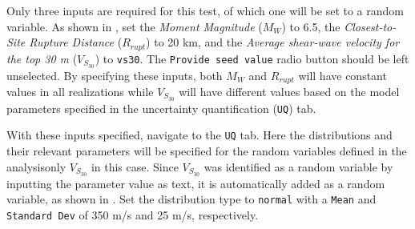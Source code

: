 Only three inputs are required for this test, of which one will be set
to a random variable. As shown in , set the
\emph{Moment Magnitude} ($M_W$) to 6.5, the \emph{Closest-to-Site Rupture Distance}
($R_{rupt}$) to 20 km, and the \emph{Average shear-wave velocity
for the top 30 m} ($V_{S_{30}}$)
to \texttt{vs30}. The \texttt{Provide seed value} radio button should
be left unselected. By specifying these inputs, both $M_{W}$ and $R_{rupt}$
will have constant values in all realizations while $V_{S_{30}}$ will
have different values based on the model parameters specified in the
uncertainty quantification (\texttt{UQ}) tab.

With these inputs specified, navigate to the \texttt{UQ} tab. Here the
distributions and their relevant parameters will be specified for the
random variables defined in the analysis\textemdash only $V_{S_{30}}$
in this case. Since $V_{S_{30}}$ was identified as a random variable
by inputting the parameter value as text, it is automatically added as
a random variable, as shown in . Set the
distribution type to \texttt{normal} with a \texttt{Mean}
and \texttt{Standard Dev} of 350 m/s and 25 m/s,
respectively.


